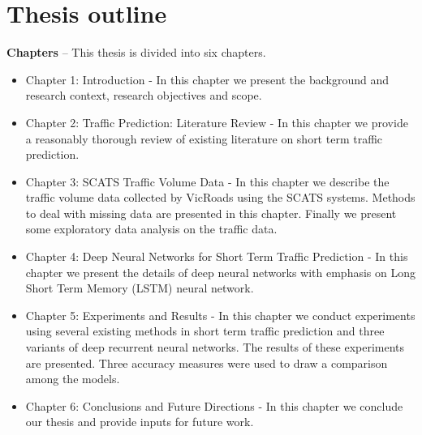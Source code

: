\section{Thesis outline}

\textbf{Chapters} -- This thesis is divided into six chapters.

\begin{itemize}
\item Chapter 1: Introduction - In this chapter we present the background and research context,
research objectives and scope.

\item Chapter 2: Traffic Prediction: Literature Review - In this chapter we provide a reasonably
thorough review of existing literature on short term traffic prediction.

\item Chapter 3: SCATS Traffic Volume Data - In this chapter we describe the traffic volume data
collected by VicRoads using the SCATS systems. Methods to deal with missing data are presented in
this chapter. Finally we present some exploratory data analysis on the traffic data.

\item Chapter 4: Deep Neural Networks for Short Term Traffic Prediction - In this chapter we present
the details of deep neural networks with emphasis on Long Short Term Memory (LSTM) neural network.

\item Chapter 5: Experiments and Results - In this chapter we conduct experiments using several
existing methods in short term traffic prediction and three variants of deep recurrent neural
networks. The results of these experiments are presented. Three accuracy measures were used to
draw a comparison among the models.

\item Chapter 6: Conclusions and Future Directions - In this chapter we conclude our thesis and
provide inputs for future work.
\end{itemize}
